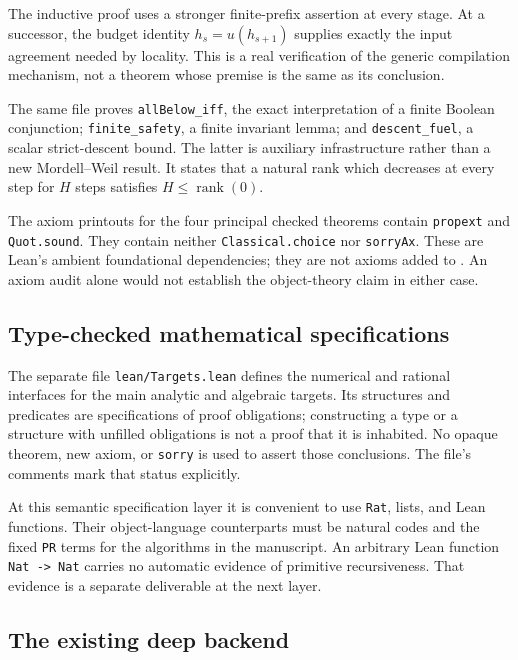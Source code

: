 The inductive proof uses a stronger finite-prefix assertion at every
stage. At a successor, the budget identity
$h_s=u(h_{s+1})$ supplies exactly the input agreement needed by locality.
This is a real verification of the generic compilation mechanism, not a
theorem whose premise is the same as its conclusion.

The same file proves \texttt{allBelow\_iff}, the exact interpretation of
a finite Boolean conjunction; \texttt{finite\_safety}, a finite invariant
lemma; and \texttt{descent\_fuel}, a scalar strict-descent bound. The
latter is auxiliary infrastructure rather than a new Mordell--Weil
result. It states that a natural rank which decreases at every step for
$H$ steps satisfies $H\le\operatorname{rank}(0)$.

The axiom printouts for the four principal checked theorems contain
\texttt{propext} and \texttt{Quot.sound}. They contain neither
\texttt{Classical.choice} nor \texttt{sorryAx}. These are Lean's ambient
foundational dependencies; they are not axioms added to \iPRA. An axiom
audit alone would not establish the object-theory claim in either case.

\subsection{Type-checked mathematical specifications}

The separate file \texttt{lean/Targets.lean} defines the numerical and
rational interfaces for the main analytic and algebraic targets. Its
structures and predicates are specifications of proof obligations;
constructing a type or a structure with unfilled obligations is not a
proof that it is inhabited. No opaque theorem, new axiom, or
\texttt{sorry} is used to assert those conclusions. The file's comments
mark that status explicitly.

At this semantic specification layer it is convenient to use
\texttt{Rat}, lists, and Lean functions. Their object-language
counterparts must be natural codes and the fixed \texttt{PR} terms for
the algorithms in the manuscript. An arbitrary Lean function
\texttt{Nat -> Nat} carries no automatic evidence of primitive
recursiveness. That evidence is a separate deliverable at the next layer.

\subsection{The existing deep backend}

